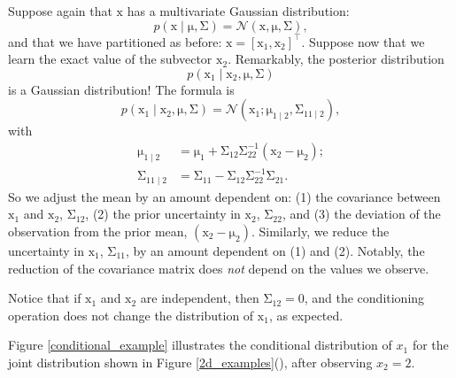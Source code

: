 \documentclass{article}
\newcommand{\given}{\mid}
\newcommand{\mc}[1]{\mathcal{#1}}
\newcommand{\inv}{^{-1}}
\newcommand{\trans}{^\top}
\newcommand{\mat}[1]{\bm{\mathrm{#1}}}
\renewcommand{\vec}[1]{\bm{\mathrm{#1}}}
\begin{document}
Suppose again that $\vec{x}$ has a multivariate Gaussian distribution:
\begin{equation*}
  p(\vec{x} \given \vec{\mu}, \mat{\Sigma})
  =
  \mc{N}(\vec{x}, \vec{\mu}, \mat{\Sigma}),
\end{equation*}
and that we have partitioned as before: $\vec{x} = [\vec{x}_1,
  \vec{x}_2]\trans$.  Suppose now that we learn the exact value of the
subvector $\vec{x}_2$.  Remarkably, the posterior distribution
\begin{equation*}
  p(\vec{x}_1 \given \vec{x}_2, \vec{\mu}, \mat{\Sigma})
\end{equation*}
is a Gaussian distribution!  The formula is
\begin{equation*}
  p(\vec{x}_1 \given \vec{x}_2, \vec{\mu}, \mat{\Sigma})
  =
  \mc{N}(\vec{x}_1; \vec{\mu}_{1 \given 2}, \mat{\Sigma}_{11 \given 2}),
\end{equation*}
with
\begin{align*}
  \vec{\mu}_{1 \given 2}
  &=
  \vec{\mu}_1 + \mat{\Sigma}_{12}\mat{\Sigma}_{22}\inv (\vec{x}_2 - \vec{\mu}_2);
  \\
  \mat{\Sigma}_{11 \given 2}
  &=
  \mat{\Sigma}_{11} - \mat{\Sigma}_{12}\mat{\Sigma}_{22}\inv \mat{\Sigma}_{21}.
\end{align*}
So we adjust the mean by an amount dependent on: (1) the covariance
between $\vec{x}_1$ and $\vec{x}_2$, $\mat{\Sigma}_{12}$, (2) the
prior uncertainty in $\vec{x}_2$, $\mat{\Sigma}_{22}$, and (3) the
deviation of the observation from the prior mean, $(\vec{x}_2 -
\vec{\mu}_2)$.  Similarly, we reduce the uncertainty in $\vec{x}_1$,
$\mat{\Sigma}_{11}$, by an amount dependent on (1) and (2).  Notably,
the reduction of the covariance matrix does \emph{not} depend on the
values we observe.

Notice that if $\vec{x}_1$ and $\vec{x}_2$ are independent, then
$\mat{\Sigma}_{12} = \mat{0}$, and the conditioning operation does not
change the distribution of $\vec{x}_1$, as expected.

Figure \ref{conditional_example} illustrates the conditional
distribution of $x_1$ for the joint distribution shown in Figure
\ref{2d_examples}(), after observing $x_2 = 2$.
\end{document}
